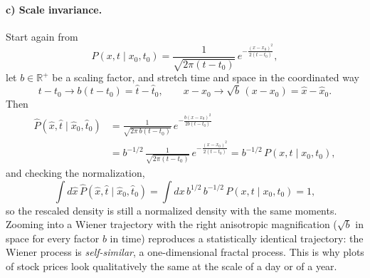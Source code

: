 \paragraph{c) Scale invariance.}
Start again from
\begin{equation}
P(x,t\mid x_0,t_0) = \frac{1}{\sqrt{2\pi(t-t_0)}}\,e^{-\frac{(x-x_0)^2}{2(t-t_0)}},
\end{equation}
let $b\in\mathbb{R}^+$ be a scaling factor, and stretch time and space in the coordinated way
\begin{equation}
t-t_0 \to b(t-t_0) = \hat t - \hat t_0,\qquad x-x_0 \to \sqrt{b}\,(x-x_0) = \hat x - \hat x_0.
\end{equation}
Then
\begin{equation}\begin{split}
\hat P(\hat x,\hat t\mid \hat x_0,\hat t_0) &= \frac{1}{\sqrt{2\pi\,b(t-t_0)}}\,e^{-\frac{b(x-x_0)^2}{2b(t-t_0)}}\\
&= b^{-1/2}\,\frac{1}{\sqrt{2\pi(t-t_0)}}\,e^{-\frac{(x-x_0)^2}{2(t-t_0)}} = b^{-1/2}\,P(x,t\mid x_0,t_0),
\end{split}\end{equation}
and checking the normalization,
\begin{equation}
\int d\hat x\, \hat P(\hat x,\hat t\mid \hat x_0,\hat t_0) = \int dx\, b^{1/2}\,b^{-1/2}\,P(x,t\mid x_0,t_0) = 1,
\end{equation}
so the rescaled density is still a normalized density with the same moments.
Zooming into a Wiener trajectory with the right anisotropic magnification ($\sqrt{b}$ in space for every factor $b$ in time) reproduces a statistically identical trajectory: the Wiener process is \emph{self-similar}, a one-dimensional fractal process.
This is why plots of stock prices look qualitatively the same at the scale of a day or of a year.

